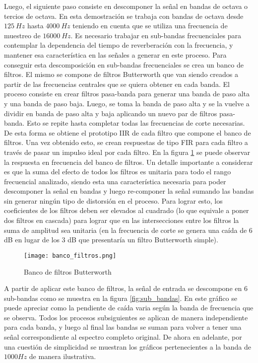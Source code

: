 Luego, el siguiente paso consiste en descomponer la señal en bandas de octava o tercios de octava. En esta demostración se trabaja con bandas de octava desde $125 \ Hz$ hasta $4000 \ Hz$ teniendo en cuenta que se utiliza una frecuencia de muestreo de $16000 \ Hz$. Es necesario trabajar en sub-bandas frecuenciales para contemplar la dependencia del tiempo de reverberación con la frecuencia, y mantener esa característica en las señales a generar en este proceso. Para conseguir esta descomposición en sub-bandas frecuenciales se crea un banco de filtros. El mismo se compone de filtros Butterworth que van siendo creados a partir de las frecuencias centrales que se quiera obtener en cada banda. El proceso consiste en crear filtros pasa-banda para generar una banda de paso alta y una banda de paso baja. Luego, se toma la banda de paso alta y se la vuelve a dividir en banda de paso alta y baja aplicando un nuevo par de filtros pasa-banda. Esto se repite hasta completar todas las frecuencias de corte necesarias. De esta forma se obtiene el prototipo IIR de cada filtro que compone el banco de filtros. Una vez obtenido esto, se crean respuestas de tipo FIR para cada filtro a través de pasar un impulso ideal por cada filtro. En la figura \ref{fig:banco_filtros} se puede observar la respuesta en frecuencia del banco de filtros. Un detalle importante a considerar es que la suma del efecto de todos los filtros es unitaria para todo el rango frecuencial analizado, siendo esta una característica necesaria para poder descomponer la señal en bandas y luego re-componer la señal sumando las bandas sin generar ningún tipo de distorsión en el proceso. Para lograr esto, los coeficientes de los filtros deben ser elevados al cuadrado (lo que equivale a poner dos filtros en cascada) para lograr que en las intersecciones entre los filtros la suma de amplitud sea unitaria (en la frecuencia de corte se genera una caída de 6 dB en lugar de los 3 dB que presentaría un filtro Butterworth simple). 

\begin{figure}[H]
	\centering{}
	\texttt{[image: banco\_filtros.png]}
	\caption{Banco de filtros Butterworth}
	\label{fig:banco_filtros}
\end{figure}

A partir de aplicar este banco de filtros, la señal de entrada se descompone en 6 sub-bandas como se muestra en la figura \ref{fig:sub_bandas}. En este gráfico se puede apreciar como la pendiente de caída varia según la banda de frecuencia que se observa. Todos los procesos subsiguientes se aplican de manera independiente para cada banda, y luego al final las bandas se suman para volver a tener una señal correspondiente al espectro completo original. De ahora en adelante, por una cuestión de simplicidad se muestran los gráficos pertenecientes a la banda de $1000 Hz$ de manera ilustrativa.

